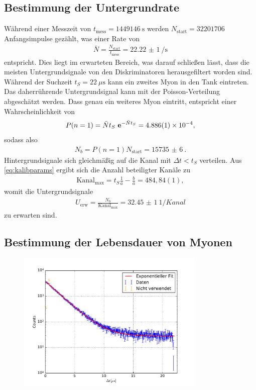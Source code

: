 \subsection{Bestimmung der Untergrundrate}
Während einer Messzeit von $t_\text{mess}=\SI{1449146}{\second}$ werden $N_\text{start}=\SI{32201706}{}$ Anfangsimpulse gezählt, was einer Rate von 
\begin{align}
 \bar N = \frac{N_\text{start}}{t_\text{mess}} = \SI{22,22(1)}{\per\second}
\end{align}
entspricht. Dies liegt im erwarteten Bereich, was darauf schließen lässt, dass die meisten Untergrundsignale von den Diskriminatoren herausgefiltert
worden sind. Während der Suchzeit $t_S=\SI{22}{\mu\second}$ kann ein zweites Myon in den Tank eintreten. Das daherrührende Untergrundsignal kann
mit der Poisson-Verteilung abgeschätzt werden. Dass genau ein weiteres Myon eintritt, entspricht einer Wahrscheinlichkeit von
\begin{align}
 P(n=1) = \bar N t_S \e^{-\bar N t_S} = \SI{4,886(1)e-4}{},
\end{align}
sodass also 
\begin{align}
 N_b = P(n=1)N_\text{start} = \SI{15735(6)}{}.
\end{align}
Hintergrundsignale sich gleichmäßig auf die Kanal mit $\Delta t < t_S$ verteilen. Aus \eqref{eq:kalibparams} ergibt sich die Anzahl beteiligter 
Kanäle zu
\begin{align}
 \text{Kanal}_\text{max} = t_S\frac{1}{a} - \frac{b}{a}  = 484,84(1),
\end{align}
womit die Untergrundsignale
\begin{align}
 U_\text{erw} = \frac{N_b}{\text{Kanal}_\text{max}} = \SI{32,45(1)}{1\per Kanal}
\end{align}
zu erwarten sind.
\subsection{Bestimmung der Lebensdauer von Myonen}


\begin{figure}[t]
 \includegraphics[width=0.8\textwidth]{../pics/lebensdauer_fit}
 \caption{}
 \label{pic:lebensdauer}
\end{figure}



